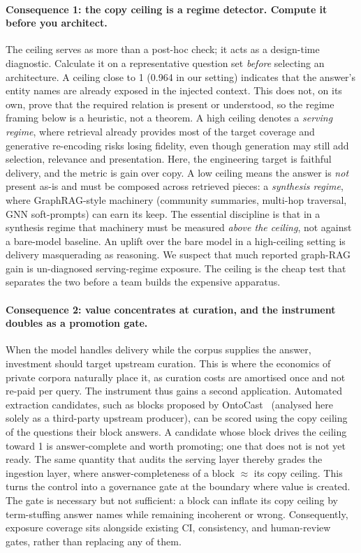 \documentclass[10pt,twocolumn]{article}
\begin{document}
\paragraph{Consequence 1: the copy ceiling is a regime detector. Compute it before you architect.}
The ceiling serves as more than a post-hoc check; it acts as a design-time diagnostic. Calculate it on a representative question set \emph{before} selecting an architecture. A ceiling close to 1 (0.964 in our setting) indicates that the answer's entity names are already exposed in the injected context. This does not, on its own, prove that the required relation is present or understood, so the regime framing below is a heuristic, not a theorem. A high ceiling denotes a \emph{serving regime}, where retrieval already provides most of the target coverage and generative re-encoding risks losing fidelity, even though generation may still add selection, relevance and presentation. Here, the engineering target is faithful delivery, and the metric is gain over copy. A low ceiling means the answer is \emph{not} present as-is and must be composed across retrieved pieces: a \emph{synthesis regime}, where GraphRAG-style machinery (community summaries, multi-hop traversal, GNN soft-prompts) can earn its keep. The essential discipline is that in a synthesis regime that machinery must be measured \emph{above the ceiling}, not against a bare-model baseline. An uplift over the bare model in a high-ceiling setting is delivery masquerading as reasoning. We suspect that much reported graph-RAG gain is un-diagnosed serving-regime exposure. The ceiling is the cheap test that separates the two before a team builds the expensive apparatus.

\paragraph{Consequence 2: value concentrates at curation, and the instrument doubles as a promotion
gate.} When the model handles delivery while the corpus supplies the answer, investment should target upstream curation. This is where the economics of private corpora naturally place it, as curation costs are amortised once and not re-paid per query. The instrument thus gains a second application. Automated extraction candidates, such as blocks proposed by OntoCast~\cite{ontocast} (analysed here solely as a third-party upstream producer), can be scored using the copy ceiling of the questions their block answers. A candidate whose block drives the ceiling toward 1 is answer-complete and worth promoting; one that does not is not yet ready. The same quantity that audits the serving layer thereby grades the ingestion layer, where answer-completeness of a block $\approx$ its copy ceiling. This turns the control into a governance gate at the boundary where value is created. The gate is necessary but not sufficient: a block can inflate its copy ceiling by term-stuffing answer names while remaining incoherent or wrong. Consequently, exposure coverage sits alongside existing CI, consistency, and human-review gates, rather than replacing any of them.
\end{document}
